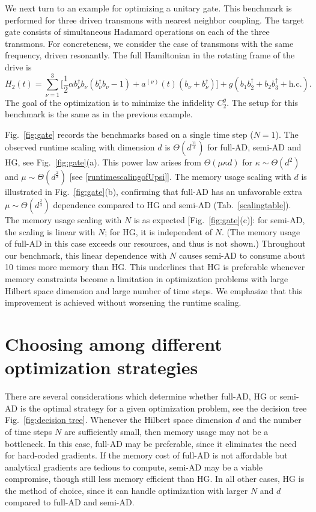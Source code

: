 \documentclass[letterpaper,10pt]{iopart}
\begin{document}
We next turn to an example for optimizing a unitary gate. This benchmark is performed for three driven transmons with nearest neighbor coupling. The target gate consists of simultaneous Hadamard operations on each of the three transmons. For concreteness, we consider the case of transmons with the same frequency, driven resonantly. The full Hamiltonian in the rotating frame of the drive is
\begin{equation}
\label{gateH}
    H_2(t)=\sum_{\nu=1}^{3}\bigg[\frac{1}{2}\alpha b_\nu^\dagger b_\nu (b_\nu^\dagger b_\nu-1)+a^{(\nu)}(t)(b_\nu+b_\nu^\dagger)\bigg]+g(b_1b_{2}^\dagger+b_2b_{3}^\dagger+\text{h.c.}).
\end{equation}
The goal of the optimization is to minimize the infidelity $C_2^{ g}$. The setup for this benchmark is the same as in the previous example.



Fig.\ \ref{fig:gate} records the  benchmarks based on a single time step ($N=1$). The observed runtime scaling with dimension $d$ is $\Theta(d^{\frac{11}{3}})$ for full-AD, semi-AD and HG, see Fig.\ \ref{fig:gate}(a). This power law arises from $\Theta(\mu\kappa d)$ for $\kappa\sim \Theta(d^2)$ and $\mu\sim \Theta(d^{\frac{2}{3}})$ [see   \ref{runtimescalingofUpsi}]. The memory usage scaling with $d$ is illustrated in Fig.\ \ref{fig:gate}(b), confirming that full-AD has an unfavorable extra $\mu \sim \Theta(d^{\frac{2}{3}})$ dependence compared to HG and semi-AD (Tab.\  \ref{scalingtable}). The memory usage scaling with $N$ is as expected [Fig.\ \ref{fig:gate}(c)]: for semi-AD, the scaling is linear with $N$; for HG, it is independent of $N$. (The memory usage of full-AD in this case exceeds our resources, and thus is not shown.) Throughout our benchmark, this linear dependence with $N$ causes semi-AD to consume about 10 times more memory than HG. This underlines that HG is preferable whenever memory constraints become a limitation in optimization problems with large Hilbert space dimension and large number of time steps. We emphasize that this improvement is achieved without worsening the runtime scaling. 


\section{Choosing among different optimization strategies }
\label{Decision tree}
There are several considerations which determine whether full-AD, HG or semi-AD is the optimal strategy for a given optimization problem, see the decision tree Fig.\ \ref{fig:decision tree}. Whenever the Hilbert space dimension $d$ and the number of time steps $N$ are sufficiently small, then memory usage may not be a bottleneck. In this case, full-AD may be preferable, since it eliminates the need for hard-coded gradients. If the memory cost of full-AD is not affordable but analytical gradients are tedious to compute, semi-AD may be a viable compromise, though still less memory efficient than HG. In all other cases, HG is the method of choice, since it can handle optimization with larger $N$ and $d$ compared to full-AD and semi-AD. 
\end{document}

